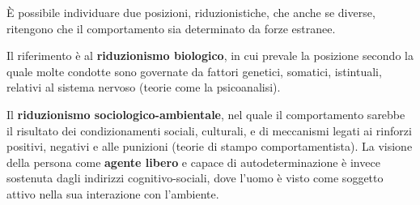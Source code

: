 \documentclass{subfiles}
\begin{document}
È possibile individuare due posizioni, riduzionistiche, che anche se diverse, ritengono che il comportamento
sia determinato da forze estranee.

Il riferimento è al \textbf{riduzionismo biologico}, in cui prevale la posizione secondo
la quale molte condotte sono governate da fattori genetici, somatici, istintuali, relativi al sistema
nervoso (teorie come la psicoanalisi).

Il \textbf{riduzionismo sociologico-ambientale}, nel quale il comportamento sarebbe
il risultato dei condizionamenti sociali, culturali, e di meccanismi legati ai rinforzi positivi, negativi e alle punizioni
(teorie di stampo comportamentista). La visione della persona come \textbf{agente libero} e capace di autodeterminazione è invece
sostenuta dagli indirizzi cognitivo-sociali, dove l'uomo è visto come soggetto attivo nella sua interazione con l'ambiente.
\end{document}
